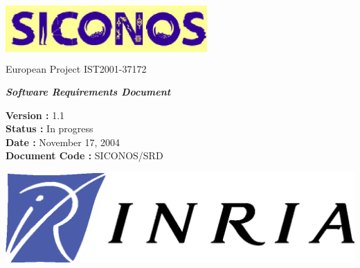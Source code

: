 


%

\thispagestyle{empty}

\begin{center}
\includegraphics[height=23mm, width=77mm]{figure/siconos.eps}\\
\textsf{European Project IST2001-37172}\\[6cm]
\end{center}

\begin{center}
\huge
\textsf{\textbf{\textit{Software Requirements Document}}}\\[2.5cm]
\end{center}

\large
\begin{center}
\textsf{\textbf{Version :} 1.1}\\
\textsf{\textbf{Status :}  In progress}\\
\textsf{\textbf{Date : } November 17, 2004}\\
\textsf{\textbf{Document Code :} SICONOS/SRD}\\[5cm]

\end{center}

\normalsize

\begin{flushright}
\includegraphics[scale=0.3]{figure/Logo-INRIA.eps}
\end{flushright}

\clearpage





